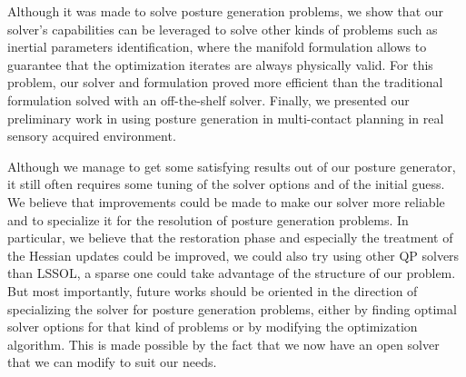 Although it was made to solve posture generation problems, we show that our solver's capabilities can be leveraged to solve other kinds of problems such as inertial parameters identification, where the manifold formulation allows to guarantee that the optimization iterates are always physically valid.
For this problem, our solver and formulation proved more efficient than the traditional formulation solved with an off-the-shelf solver.
Finally, we presented our preliminary work in using posture generation in multi-contact planning in real sensory acquired environment.


Although we manage to get some satisfying results out of our posture generator, it still often requires some tuning of the solver options and of the initial guess.
We believe that improvements could be made to make our solver more reliable and to specialize it for the resolution of posture generation problems.
In particular, we believe that the restoration phase and especially the treatment of the Hessian updates could be improved, we could also try using other QP solvers than LSSOL, a sparse one could take advantage of the structure of our problem.
But most importantly, future works should be oriented in the direction of specializing the solver for posture generation problems, either by finding optimal solver options for that kind of problems or by modifying the optimization algorithm.
This is made possible by the fact that we now have an open solver that we can modify to suit our needs.

